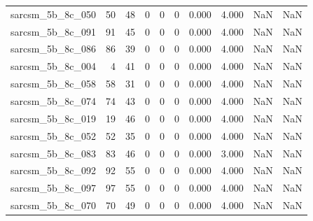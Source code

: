 \documentclass{article}
\begin{document}
\begin{longtable}{lrrrrrrrrr}
sarcsm\_5b\_8c\_050 & 50 & 48 & 0 & 0 & 0 & 0.000 & 4.000 & NaN & NaN \\
sarcsm\_5b\_8c\_091 & 91 & 45 & 0 & 0 & 0 & 0.000 & 4.000 & NaN & NaN \\
sarcsm\_5b\_8c\_086 & 86 & 39 & 0 & 0 & 0 & 0.000 & 4.000 & NaN & NaN \\
sarcsm\_5b\_8c\_004 & 4 & 41 & 0 & 0 & 0 & 0.000 & 4.000 & NaN & NaN \\
sarcsm\_5b\_8c\_058 & 58 & 31 & 0 & 0 & 0 & 0.000 & 4.000 & NaN & NaN \\
sarcsm\_5b\_8c\_074 & 74 & 43 & 0 & 0 & 0 & 0.000 & 4.000 & NaN & NaN \\
sarcsm\_5b\_8c\_019 & 19 & 46 & 0 & 0 & 0 & 0.000 & 4.000 & NaN & NaN \\
sarcsm\_5b\_8c\_052 & 52 & 35 & 0 & 0 & 0 & 0.000 & 4.000 & NaN & NaN \\
sarcsm\_5b\_8c\_083 & 83 & 46 & 0 & 0 & 0 & 0.000 & 3.000 & NaN & NaN \\
sarcsm\_5b\_8c\_092 & 92 & 55 & 0 & 0 & 0 & 0.000 & 4.000 & NaN & NaN \\
sarcsm\_5b\_8c\_097 & 97 & 55 & 0 & 0 & 0 & 0.000 & 4.000 & NaN & NaN \\
sarcsm\_5b\_8c\_070 & 70 & 49 & 0 & 0 & 0 & 0.000 & 4.000 & NaN & NaN \\
\end{longtable}
\end{document}
